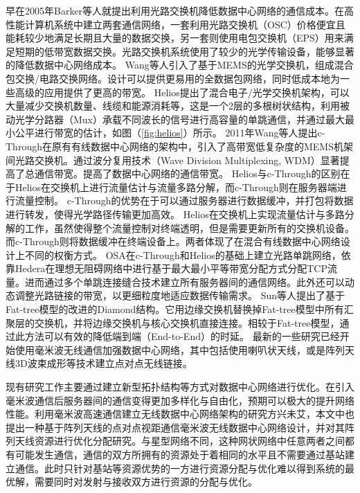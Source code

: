 早在2005年Barker等人就提出利用光路交换机\cite{barker2005feasibility}降低数据中心网络的通信成本。在高性能计算机系统中建立两套通信网络，一套利用光路交换机（OSC）价格便宜且能耗较少地满足长期且大量的数据交换，另一套则使用电包交换机（EPS）用来满足短期的低带宽数据交换。光路交换机系统使用了较少的光学传输设备，能够显著的降低数据中心网络成本。
Wang等人引入了基于MEMS的光学交换机\cite{wang2009your}，组成混合包交换/电路交换网络。设计可以提供更易用的全数据包网络，同时低成本地为一些高级的应用提供了更高的带宽。
Helios\cite{farrington2010helios}提出了混合电子/光学交换机架构，可以大量减少交换机数量、线缆和能源消耗等，这是一个2层的多根树状结构，利用被动光学分路器（Mux）承载不同波长的信号进行高容量的单跳通信，并通过最大最小公平进行带宽的估计，如图（\ref{fig:helios}）所示。
2011年Wang等人提出c-Through\cite{wang2011c}在原有有线数据中心网络的架构中，引入了高带宽低复杂度的MEMS机架间光路交换机。通过波分复用技术（Wave Division Multiplexing, WDM）显著提高了总通信带宽。提高了数据中心网络的通信带宽。
Helios与c-Through的区别在于Helios在交换机上进行流量估计与流量多路分解，而c-Through则在服务器端进行流量控制。 c-Through的优势在于可以通过服务器进行数据缓冲，并打包将数据进行转发，使得光学路径传输更加高效。
Helios在交换机上实现流量估计与多路分解的工作，虽然使得整个流量控制对终端透明，但是需要更新所有的交换机设备。而c-Through则将数据缓冲在终端设备上。两者体现了在混合有线数据中心网络设计上不同的权衡方式。
OSA\cite{chen2014osa}在c-Through和Helios的基础上建立光路单跳网络，依靠Hedera\cite{al2010hedera}在理想无阻碍网络中进行基于最大最小平等带宽分配方式分配TCP流量。进而通过多个单跳连接缝合技术建立所有服务器间的通信网络。此外还可以动态调整光路链接的带宽，以更细粒度地适应数据传输需求。
Sun等人提出了基于Fat-tree模型的改进的Diamond\cite{sun2014diamond}结构。它用边缘交换机替换掉Fat-tree模型中所有汇聚层的交换机，并将边缘交换机与核心交换机直接连接。相较于Fat-tree模型，通过此方法可以有效的降低端到端（End-to-End）的时延。
最新的一些研究已经开始使用毫米波无线通信加强数据中心网络，其中包括使用喇叭状天线\cite{halperin2011augmenting}，或是阵列天线3D波束成形\cite{zhang20113d,zhou2012mirror}等技术建立点对点无线链接。

现有研究工作主要通过建立新型拓扑结构等方式对数据中心网络进行优化。在引入毫米波通信后服务器间的通信变得更加多样化与自由化，预期可以极大的提升网络性能。利用毫米波高速通信建立无线数据中心网络架构的研究方兴未艾，本文中也提出一种基于阵列天线的点对点视距通信毫米波无线数据中心网络设计，并对其阵列天线资源进行优化分配研究。与星型网络不同，这种网状网络中任意两者之间都有可能发生通信，通信的双方所拥有的资源处于着相同的水平且不需要通过基站建立通信。此时只针对基站等资源优势的一方进行资源分配与优化难以得到系统的最优解，需要同时对发射与接收双方进行资源的分配与优化。

